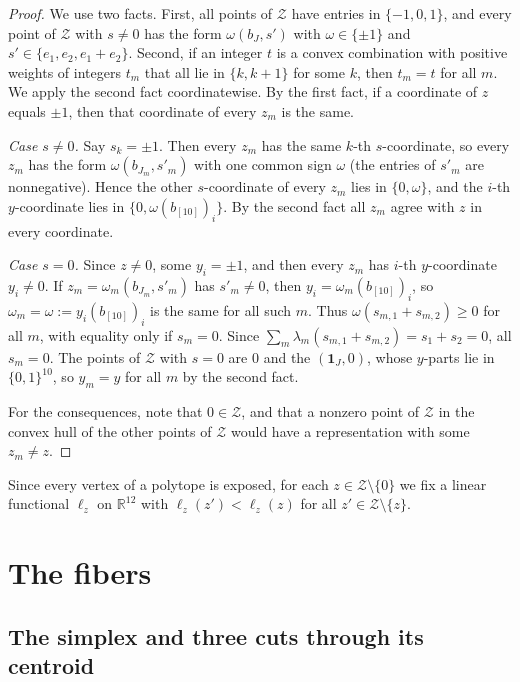 \documentclass[11pt]{article}
\newcommand{\R}{\mathbb{R}}
\newcommand{\Zcal}{\mathcal{Z}}
\newcommand{\1}{\mathbf{1}}
\begin{document}
\begin{proof}
We use two facts. First, all points of $\Zcal$ have entries in $\{-1,0,1\}$, and every point of $\Zcal$ with $s\ne0$ has the
form $\omega(b_J,s')$ with $\omega\in\{\pm1\}$ and $s'\in\{e_1,e_2,e_1+e_2\}$. Second, if an integer $t$ is a convex
combination with positive weights of integers $t_m$ that all lie in $\{k,k+1\}$ for some $k$, then $t_m=t$ for all $m$. We
apply the second fact coordinatewise. By the first fact, if a coordinate of $z$ equals $\pm1$, then that coordinate of every
$z_m$ is the same.

\emph{Case $s\ne0$.} Say $s_k=\pm1$. Then every $z_m$ has the same $k$-th $s$-coordinate, so every $z_m$ has the form
$\omega(b_{J_m},s'_m)$ with one common sign $\omega$ (the entries of $s'_m$ are nonnegative). Hence the other $s$-coordinate
of every $z_m$ lies in $\{0,\omega\}$, and the $i$-th $y$-coordinate lies in $\{0,\omega(b_{[10]})_i\}$. By the second fact
all $z_m$ agree with $z$ in every coordinate.

\emph{Case $s=0$.} Since $z\ne0$, some $y_i=\pm1$, and then every $z_m$ has $i$-th $y$-coordinate $y_i\ne0$. If
$z_m=\omega_m(b_{J_m},s'_m)$ has $s'_m\ne0$, then $y_i=\omega_m(b_{[10]})_i$, so $\omega_m=\omega:=y_i(b_{[10]})_i$ is the
same for all such $m$. Thus $\omega(s_{m,1}+s_{m,2})\ge0$ for all $m$, with equality only if $s_m=0$. Since
$\sum_m\lambda_m(s_{m,1}+s_{m,2})=s_1+s_2=0$, all $s_m=0$. The points of $\Zcal$ with $s=0$ are $0$ and the $(\1_J,0)$,
whose $y$-parts lie in $\{0,1\}^{10}$, so $y_m=y$ for all $m$ by the second fact.

For the consequences, note that $0\in\Zcal$, and that a nonzero point of $\Zcal$ in the convex hull of the other points of
$\Zcal$ would have a representation with some $z_m\ne z$.
\end{proof}

Since every vertex of a polytope is exposed, for each $z\in\Zcal\setminus\{0\}$ we fix a linear functional $\ell_z$ on
$\R^{12}$ with $\ell_z(z')<\ell_z(z)$ for all $z'\in\Zcal\setminus\{z\}$.

\section{The fibers}\label{sec:fibers}

\subsection{The simplex and three cuts through its centroid}\label{sec:simplex}
\end{document}
